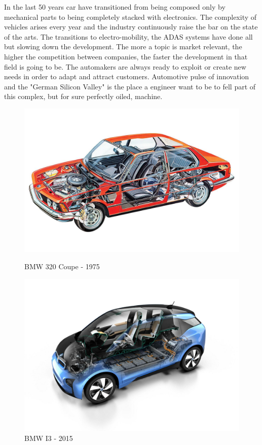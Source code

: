 \documentclass[../main.tex]{subfiles}
\begin{document}
In the last 50 years car have transitioned from being composed only by mechanical parts to being completely stacked with electronics. The complexity of vehicles arises every year and the industry continuously raise the bar on the state of the arts. The transitions to electro-mobility, the ADAS systems have done all but slowing down the development. The more a topic is market relevant, the higher the competition between companies, the faster the development in that field is going to be. The automakers are always ready to exploit or create new needs in order to adapt and attract customers. Automotive pulse of innovation and the "German Silicon Valley" is the place a engineer want to be to fell part of this complex, but for sure perfectly oiled, machine.   
\begin{figure}
\centering
\begin{minipage}{.5\textwidth}
  \centering
  \includegraphics[width=\linewidth]{images_folder/4a56e1d50b56da42a10e29d451cf2b93.jpg}
  \caption{BMW 320 Coupe - 1975}
  \label{fig:test1}
\end{minipage}%
\begin{minipage}{.5\textwidth}
  \centering
  \includegraphics[width=\linewidth]{images_folder/BMW_i3.jpg}
  \caption{BMW I3 - 2015}
  \label{fig:test2}
\end{minipage}
\end{figure}
\end{document}
